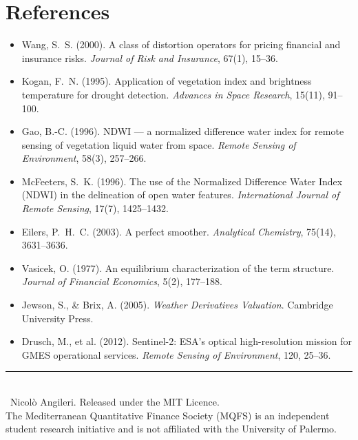\documentclass[11pt]{article}
\begin{document}
\section*{References}
{\small
\begin{itemize}[leftmargin=1.2em,itemsep=1pt,label={}]
\item Wang, S.~S. (2000). A class of distortion operators for pricing financial
and insurance risks. \emph{Journal of Risk and Insurance}, 67(1), 15--36.
\item Kogan, F.~N. (1995). Application of vegetation index and brightness
temperature for drought detection. \emph{Advances in Space Research}, 15(11),
91--100.
\item Gao, B.-C. (1996). NDWI --- a normalized difference water index for remote
sensing of vegetation liquid water from space. \emph{Remote Sensing of
Environment}, 58(3), 257--266.
\item McFeeters, S.~K. (1996). The use of the Normalized Difference Water Index
(NDWI) in the delineation of open water features. \emph{International Journal of
Remote Sensing}, 17(7), 1425--1432.
\item Eilers, P.~H.~C. (2003). A perfect smoother. \emph{Analytical Chemistry},
75(14), 3631--3636.
\item Vasicek, O. (1977). An equilibrium characterization of the term structure.
\emph{Journal of Financial Economics}, 5(2), 177--188.
\item Jewson, S., \& Brix, A. (2005). \emph{Weather Derivatives Valuation}.
Cambridge University Press.
\item Drusch, M., et al. (2012). Sentinel-2: ESA's optical high-resolution mission
for GMES operational services. \emph{Remote Sensing of Environment}, 120, 25--36.
\end{itemize}}

\vfill
\begin{center}\footnotesize\color{mqfsgrey}\rule{0.5\textwidth}{0.4pt}\\[0.4em]
\textcopyright\ Nicol\`o Angileri. Released under the MIT Licence.\\
The Mediterranean Quantitative Finance Society (MQFS) is an independent student
research initiative and is not affiliated with the University of Palermo.
\end{center}
\end{document}
